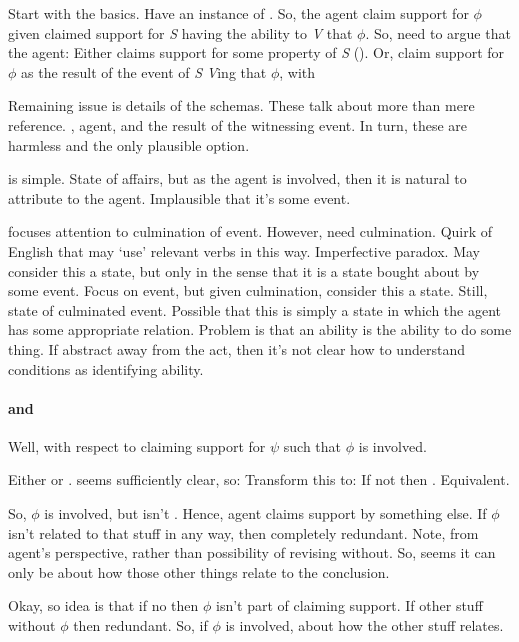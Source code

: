 \begin{note}[Argument]
  \color{red}
  Start with the basics.
  Have an instance of .
  So, the agent claim support for \(\phi\) given claimed support for \emph{S} having the ability to \emph{V} that \(\phi\).
  So, need to argue that the agent:
  Either claims support for some property of \emph{S} (\AR{}).
  Or, claim support for \(\phi\) as the result of the event of \emph{S} \emph{V}ing that \(\phi\), with 
\end{note}

\begin{note}
  Remaining issue is details of the schemas.
  These talk about more than mere reference.
  \AR{}, agent, and \WR{} the result of the witnessing event.
  In turn, these are harmless and the only plausible option.

  \AR{} is simple.
  State of affairs, but as the agent is involved, then it is natural to attribute to the agent.
  Implausible that it's some event.

  \WR{} focuses attention to culmination of event.
  However, need culmination.
  Quirk of English that may `use' relevant verbs in this way.
  Imperfective paradox.
  May consider this a state, but only in the sense that it is a state bought about by some event.
  Focus on event, but given culmination, consider this a state.
  Still, state of culminated event.
  Possible that this is simply a state in which the agent has some appropriate relation.
  Problem is that an ability is the ability to do some thing.
  If abstract away from the act, then it's not clear how to understand conditions as identifying ability.
\end{note}

\paragraph{\adA{} and \adB{}}

\begin{note}
  Well, with respect to claiming support for \(\psi\) such that \(\phi\) is involved.

  Either \adA{} or \adB{}.
  \adA{} seems sufficiently clear, so:
  Transform this to: If not \adA{} then \adB{}.
  Equivalent.
\end{note}

\begin{note}[Idea]
  So, \(\phi\) is involved, but isn't \adA{}.
  Hence, agent claims support by something else.
  If \(\phi\) isn't related to that stuff in any way, then completely redundant.
  Note, from agent's perspective, rather than possibility of revising without.
  So, seems it can only be about how those other things relate to the conclusion.

  Okay, so idea is that if no \adA{} then \(\phi\) isn't part of claiming support.
  If other stuff without \(\phi\) then redundant.
  So, if \(\phi\) is involved, about how the other stuff relates.
\end{note}

